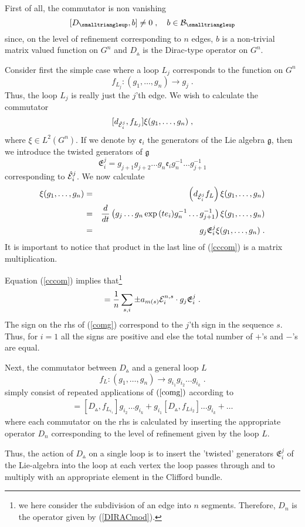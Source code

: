 \documentclass[12pt]{article}
\newcommand{\ba}{\begin{eqnarray}}
\newcommand{\ea}{\end{eqnarray}}
\newcommand{\nn}{\nonumber}
\def\cb{{\cal B}}
\def\ce{{\cal E}}
\begin{document}
First of all, the commutator is non vanishing
\[
[D_{\smalltriangleup},b]\not = 0\;,\quad b\in\cb_{\smalltriangleup}
\]
since, on the level of refinement corresponding to $n$ edges, $b$ is a non-trivial matrix valued function on $G^n$ and $D_{\smalltriangleup}$ is the Dirac-type operator on $G^n$. 

Consider first the simple case where a loop $L_j$ corresponds to the function on $G^n$
\[
f_{L_j}:(g_1,\ldots,g_n)\rightarrow g_j\;.
\]
Thus, the loop $L_{j}$ is really just the $j$'th edge. We wish to calculate the commutator
\[
[d_{\hat{\ce}^j_i},f_{L_j}]\xi(g_1,\ldots,g_n)\;,
\]
where $\xi\in L^2(G^n)$. If we denote by $\mathfrak{e}_i$ the generators of the Lie algebra $\mathfrak{g}$, then we introduce the twisted generators of $\mathfrak{g}$
\[
\mathfrak{E}_i^j= g_{j+1}g_{j+2}\ldots g_n\mathfrak{e}_i g^{-1}_{n}\ldots g^{-1}_{j+1}
\]
corresponding to $\hat{\ce}^j_i$. We now calculate
\ba 
[d_{\hat{\ce}^j_i},f_{L_j}]\xi(g_1,\ldots,g_n)&=& \left(d_{\hat{\ce}^j_i}f_L\right)  \xi(g_1,\ldots,g_n)
\nn\\
&=&\frac{d}{dt}\left( g_j\ldots g_n \exp{(t e_i)} g_n^{-1}\ldots g^{-1}_{j+1} \right)\xi(g_1,\ldots,g_n)
\nn\\
&=&g_j\mathfrak{E}_i^j\xi(g_1,\ldots,g_n)\;.
\label{cccom}
\ea
It is important to notice that product in the last line of (\ref{cccom}) is a matrix multiplication.

 Equation (\ref{cccom}) implies that\footnote{we here consider the subdivision of an edge into $n$ segments. Therefore, $D_n$ is the operator given by (\ref{DIRACmod}).}
\ba
[D_n,f_{L_j}]=\frac{1}{n}\sum_{s,i}\pm a_{m(s)}\ce^{n,s}_i \cdot g_j \mathfrak{E}^j_i  \;.
\label{comg}
\ea
The sign on the rhs of (\ref{comg}) correspond to the $j$'th sign in the sequence $s$. Thus, for $i=1$ all the signs are positive and else the total number of $+$'s and $-$'s
are equal.

Next, the commutator between $D_{\smalltriangleup}$ and a general loop $L$ 
\[
f_L:(g_1,\ldots,g_n)\rightarrow g_{i_1} g_{i_2}\ldots g_{i_k}\;.
\]
simply consist of repeated applications of $(\ref{comg})$ according to
\ba
[D_{\smalltriangleup},f_L]= [D_{\smalltriangleup},f_{L_{i_1}}]g_{i_2}\ldots g_{i_k} + g_{i_1}[D_{\smalltriangleup},f_L{_{i_2}}]\ldots g_{i_k} + \ldots
\label{coml}
\ea
where each commutator on the rhs is calculated by inserting the appropriate operator $D_n$ corresponding to the level of refinement given by the loop $L$.


Thus, the action of $D_{\smalltriangleup}$ on a single loop is to insert the 'twisted' generators $\mathfrak{E}^j_i$ of the Lie-algebra into the loop at each vertex the loop passes through and to multiply with an appropriate element in the Clifford bundle. 
\end{document}
